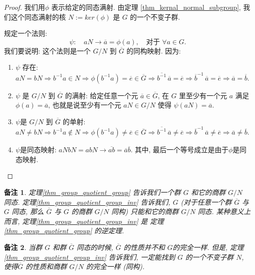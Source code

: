 \documentclass[utf8]{ctexbook}
\newtheorem{memo}{备注}[section]
\begin{document}
\begin{proof}
我们用$\phi$ 表示给定的同态满射. 由定理 \ref{thm_kernal_normal_subgroup}, 我们这个同态满射的核 $N := ker(\phi)$ 是 $G$ 的一个不变子群.

规定一个法则:
$$ \psi: \quad aN \longrightarrow \overline{a} = \phi (a), \quad \mbox{对于 } \forall a \in G .$$
我们要说明: 这个法则是一个 $G/N$ 到 $\overline{G}$ 的同构映射. 因为:
\begin{enumerate}
\item{$\psi$ 存在: $aN = bN \Rightarrow b^{-1}a \in N \Rightarrow \phi(b^{-1}a) = \overline{e} \in \overline{G} \Rightarrow \overline{b^{-1}}\, \overline{a} = \overline{e} \Rightarrow \overline{b}^{-1} \, \overline{a} = \overline{e} \Rightarrow \overline{a} = \overline{b} .$}
\item{$\psi$ 是 $G/N$ 到 $\overline{G}$ 的满射: 给定任意一个元 $\overline{a} \in \overline{G}$, 在 $G$ 里至少有一个元 $a$ 满足 $\phi(a) = \overline{a}$, 也就是说至少有一个元 $aN \in G/N$ 使得 $\psi(aN ) = \overline{a}$.}
\item{$\psi$是 $G/N$ 到 $\overline{G}$ 的单射: $aN \neq b N \Rightarrow b^{-1} a \not \in N \Rightarrow \phi(b^{-1}a) \neq \overline{e} \in \overline{G} \Rightarrow \overline{b^{-1}}\, \overline{a} \neq \overline{e} \Rightarrow \overline{b}^{-1} \, \overline{a} \neq \overline{e} \Rightarrow \overline{a} \neq \overline{b} .$}
\item{$\psi$是同态映射: $aN bN = ab N \longrightarrow \overline{ab} = \overline{a} \overline{b}.$ 其中, 最后一个等号成立是由于$\phi$是同态映射. }
\end{enumerate}

\end{proof}

\begin{memo}
定理\ref{thm_group_quotient_group} 告诉我们一个群 $G$ 和它的商群 $G/N$ 同态. 定理\ref{thm_group_quotient_group_inv} 告诉我们, $G$ (对于任意一个群 $\overline{G}$ 与 $G$ 同态, 那么 $\overline{G}$ 与 $G$ 的商群 $G/N$ 同构) 只能和它的商群 $G/N$ 同态. 某种意义上而言, 定理\ref{thm_group_quotient_group_inv} 是 定理\ref{thm_group_quotient_group} 的逆定理.
\end{memo}

\begin{memo}
当群 $G$ 和群 $\overline{G}$ 同态的时候, $\overline{G}$ 的性质并不和 $G$的完全一样. 但是, 定理\ref{thm_group_quotient_group_inv} 告诉我们, 一定能找到 $G$ 的一个不变子群 $N$, 使得$\overline{G}$ 的性质和商群 $G/N$ 的完全一样 (同构). 
\end{memo}
\end{document}
